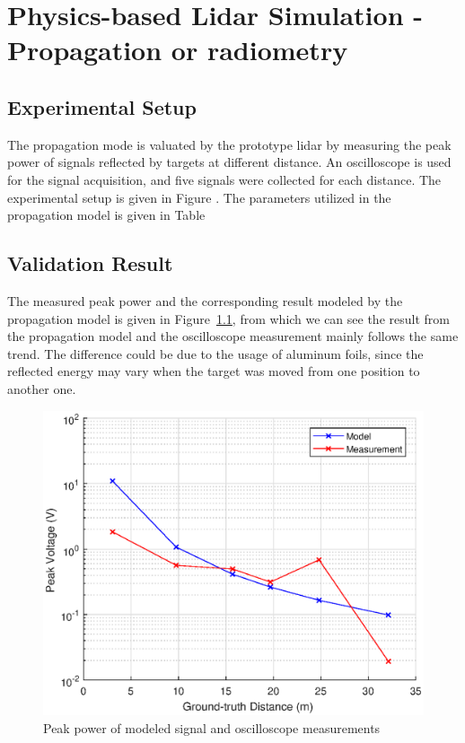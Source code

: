 \chapter{Physics-based Lidar Simulation - Propagation or radiometry}
\section{Experimental Setup}
The propagation mode is valuated by the prototype lidar by measuring the peak power of signals reflected by targets at different distance. An oscilloscope is used for the signal acquisition, and five signals were collected for each distance. The experimental setup is given in Figure . The parameters utilized in the propagation model is given in Table 
\section{Validation Result}
The measured peak power and the corresponding result modeled by the propagation model is given in Figure~\ref{fig:prop_valid}, from which we can see the result from the propagation model and the oscilloscope measurement mainly follows the same trend. The difference could be due to the usage of aluminum foils, since the reflected energy may vary when the target was moved from one position to another one.
\begin{figure}[t!p]
\centering
\includegraphics[width=1\textwidth]{figures/chapter_propagation/Res_validation_Vp_distance.eps}
\caption{Peak power of modeled signal and oscilloscope measurements}
\label{fig:prop_valid}
\end{figure}
